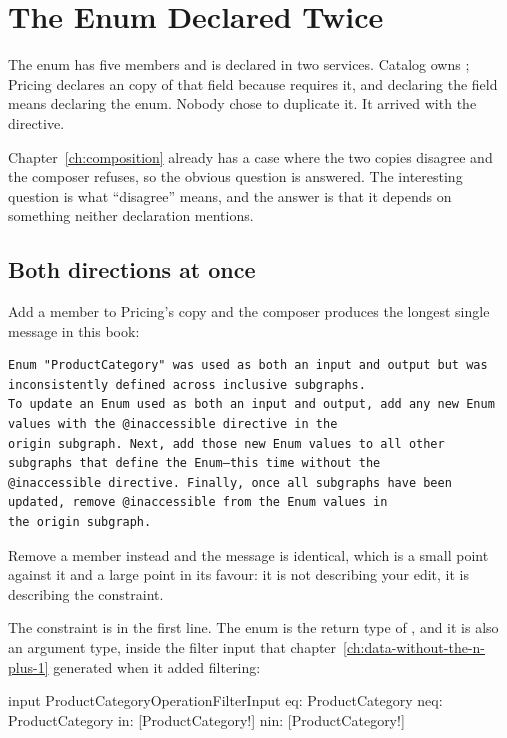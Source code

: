 \section{The Enum Declared Twice}
\label{sec:ch13-the-enum-declared-twice}
%

The  enum has five members and is declared in two
services. Catalog owns ; Pricing declares an
 copy of that field because  requires it, and
declaring the field means declaring the enum. Nobody chose to duplicate it. It
arrived with the directive.

%
Chapter~\ref{ch:composition} already has a case where the two copies disagree and
the composer refuses, so the obvious question is answered. The interesting
question is what \enquote{disagree} means, and the answer is that it depends on
something neither declaration mentions.

\subsection*{Both directions at once}

Add a member to Pricing's copy and the composer produces the longest single
message in this book:

\begin{verbatim}
Enum "ProductCategory" was used as both an input and output but was inconsistently defined across inclusive subgraphs.
To update an Enum used as both an input and output, add any new Enum values with the @inaccessible directive in the
origin subgraph. Next, add those new Enum values to all other subgraphs that define the Enum—this time without the
@inaccessible directive. Finally, once all subgraphs have been updated, remove @inaccessible from the Enum values in
the origin subgraph.
\end{verbatim}

Remove a member instead and the message is identical, which is a small point
against it and a large point in its favour: it is not describing your edit, it is
describing the constraint.

The constraint is in the first line. The enum is the return type of
, and it is also an argument type, inside the filter
input that chapter~\ref{ch:data-without-the-n-plus-1} generated when it added
filtering:

\begin{graphqlsdl}[fontsize=\footnotesize]
input ProductCategoryOperationFilterInput {
  eq: ProductCategory
  neq: ProductCategory
  in: [ProductCategory!]
  nin: [ProductCategory!]
}
\end{graphqlsdl}

